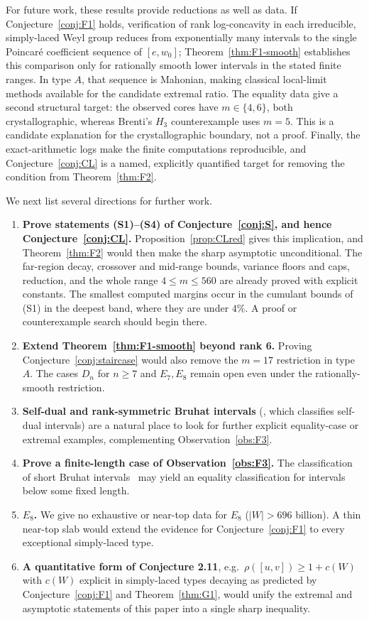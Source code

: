 \documentclass[11pt]{amsart}
\theoremstyle{plain}
\theoremstyle{definition}
\theoremstyle{remark}
\newcommand{\W}{W}
\begin{document}
For future work, these results provide reductions as well as data. If
Conjecture~\ref{conj:F1} holds, verification of rank log-concavity in each
irreducible, simply-laced Weyl group reduces from exponentially many
intervals to the single Poincar\'e coefficient sequence of $[e,w_0]$;
Theorem~\ref{thm:F1-smooth} establishes this comparison only for
rationally smooth lower intervals in the stated finite ranges. In type
$A$, that sequence is Mahonian, making classical local-limit methods
available for the candidate extremal ratio. The equality data give a
second structural target: the observed cores have
$m\in\{4,6\}$, both crystallographic, whereas Brenti's $H_3$
counterexample uses $m=5$. This is a candidate explanation for the
crystallographic boundary, not a proof. Finally, the exact-arithmetic logs
make the finite computations reproducible, and
Conjecture~\ref{conj:CL} is a named, explicitly quantified target for
removing the condition from Theorem~\ref{thm:F2}.

We next list several directions for further work.

\begin{enumerate}
\item \textbf{Prove statements (S1)--(S4) of
Conjecture~\ref{conj:S}, and hence Conjecture~\ref{conj:CL}.}
Proposition~\ref{prop:CLred} gives this implication, and
Theorem~\ref{thm:F2} would then make the sharp asymptotic unconditional.
The far-region decay, crossover and mid-range bounds, variance floors and
caps, reduction, and the whole range $4\le m\le560$ are already proved
with explicit constants. The smallest computed margins occur in the
cumulant bounds of (S1) in the deepest band, where they are under $4\%$.
A proof or counterexample search should begin there.
\item \textbf{Extend Theorem~\ref{thm:F1-smooth} beyond rank 6.}
Proving Conjecture~\ref{conj:staircase} would also remove the $m=17$
restriction in type $A$. The cases $D_n$ for $n\ge7$ and $E_7,E_8$ remain
open even under the rationally-smooth restriction.
\item \textbf{Self-dual and rank-symmetric Bruhat intervals}
(\cite{gaetzgao2020}, which classifies self-dual intervals) are a natural
place to look for further explicit equality-case or extremal examples,
complementing Observation~\ref{obs:F3}.
\item \textbf{Prove a finite-length case of
Observation~\ref{obs:F3}.} The classification of short Bruhat
intervals~\cite{short-intervals} may yield an equality classification for
intervals below some fixed length.
\item \textbf{$E_8$.} We give no exhaustive or near-top data for $E_8$
($|W|>696$ billion). A thin near-top slab would extend the evidence for
Conjecture~\ref{conj:F1} to every exceptional simply-laced type.
\item \textbf{A quantitative form of Conjecture 2.11}, e.g.\ $\rho([u,v])
\ge 1+c(\W)$ with $c(\W)$ explicit in simply-laced types decaying as
predicted by Conjecture~\ref{conj:F1} and Theorem~\ref{thm:G1}, would unify
the extremal and asymptotic statements of this paper into a single sharp
inequality.
\end{enumerate}
\end{document}

